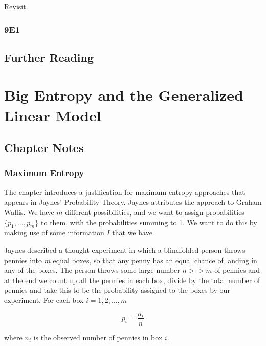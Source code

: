 \documentclass[
]{book}
\begin{document}
Revisit.

\hypertarget{e1-7}{%
\subsection*{9E1}\label{e1-7}}

\hypertarget{further-reading-7}{%
\section*{Further Reading}\label{further-reading-7}}

\hypertarget{big_entropy}{%
\chapter{Big Entropy and the Generalized Linear Model}\label{big_entropy}}

\hypertarget{chapter-notes-9}{%
\section{Chapter Notes}\label{chapter-notes-9}}

\hypertarget{maximum-entropy}{%
\subsection*{Maximum Entropy}\label{maximum-entropy}}

The chapter introduces a justification for maximum entropy approaches that appears in Jaynes' Probability Theory. Jaynes attributes the approach to Graham Wallis. We have \(m\) different possibilities, and we want to assign probabilities \(\{ p_1, \dots, p_m \}\) to them, with the probabilities summing to 1. We want to do this by making use of some information \(I\) that we have.

Jaynes described a thought experiment in which a blindfolded person throws pennies into \(m\) equal boxes, so that any penny has an equal chance of landing in any of the boxes. The person throws some large number \(n >> m\) of pennies and at the end we count up all the pennies in each box, divide by the total number of pennies and take this to be the probability assigned to the boxes by our experiment. For each box \(i = 1,2,\dots,m\)

\[
p_i = \frac{n_i}{n} 
\]

where \(n_i\) is the observed number of pennies in box \(i\).
\end{document}

